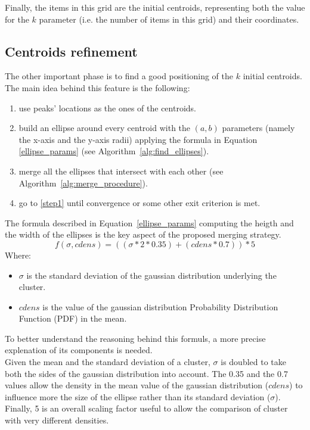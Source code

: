 Finally, the items in this grid are the initial centroids, representing both the value for the
$k$ parameter (i.e. the number of items in this grid) and their coordinates.


\subsection{Centroids refinement}
The other important phase is to find a good positioning of the $k$ initial centroids.
The main idea behind this feature is the following:
\begin{enumerate}
    \item \label{step1} use peaks' locations as the ones of the centroids.
    \item build an ellipse around every centroid with the $(a,b)$ parameters (namely the x-axis
        and the y-axis radii) applying the formula in Equation \ref{ellipse_params} (see
        Algorithm~\ref{alg:find_ellipses}).
    \item merge all the ellipses that intersect with each other (see
        Algorithm~\ref{alg:merge_procedure}).
    \item go to \ref{step1} until convergence or some other exit criterion is met.
\end{enumerate}




The formula described in Equation~\ref{ellipse_params} computing the heigth and the width of
the ellipses is the key aspect of the proposed merging strategy.
\begin{equation}
\label{ellipse_params}
    f(\sigma, cdens) = ((\sigma * 2 * 0.35) + (cdens * 0.7)) * 5
\end{equation}
Where:
\begin{itemize}
    \item $\sigma$ is the standard deviation of the gaussian distribution underlying the cluster.
    \item $cdens$ is the value of the gaussian distribution Probability Distribution Function (PDF)
        in the mean.
\end{itemize}

To better understand the reasoning behind this formuls, a more precise explenation of its components
is needed.\\
Given the mean and the standard deviation of a cluster,
$\sigma$ is doubled to take both the sides of the gaussian distribution into account.
The 0.35 and the 0.7 values allow the density in the mean value of the gaussian distribution ($cdens$)
to influence more the size of the ellipse rather than its standard deviation ($\sigma$). Finally, 5 is
an overall scaling factor useful to allow the comparison of cluster with very different densities.

